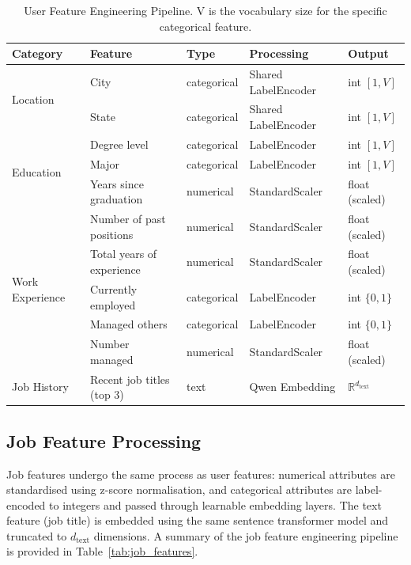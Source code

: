 \begin{table}[H]
    \centering
    \caption{User Feature Engineering Pipeline. V is the vocabulary size for the specific categorical feature. }
    \label{tab:user_features}
    \begin{tabular}{llllp{3.5cm}}
        \toprule
        \textbf{Category} & \textbf{Feature} & \textbf{Type} & \textbf{Processing} & \textbf{Output} \\
        \midrule
        \multirow{2}{*}{Location}
            & City  & categorical & Shared LabelEncoder & int $[1, V]$ \\
            & State & categorical & Shared LabelEncoder & int $[1, V]$ \\
        \midrule
        \multirow{3}{*}{Education}
            & Degree level   & categorical & LabelEncoder & int $[1, V]$ \\
            & Major  & categorical & LabelEncoder & int $[1, V]$ \\
            & Years since graduation & numerical & StandardScaler & float (scaled) \\
        \midrule
        \multirow{5}{*}{Work Experience}
            & Number of past positions & numerical & StandardScaler & float (scaled) \\
            & Total years of experience & numerical & StandardScaler & float (scaled) \\
            & Currently employed & categorical & LabelEncoder & int $\{0,1\}$ \\
            & Managed others & categorical & LabelEncoder & int $\{0,1\}$ \\
            & Number managed & numerical & StandardScaler & float (scaled) \\
        \midrule
        Job History & Recent job titles (top $3$) & text & Qwen Embedding & $\mathbb{R}^{d_{\text{text}}}$ \\
        \bottomrule
    \end{tabular}
\end{table}

\subsection{Job Feature Processing}
\label{sec:job_features_processing}

Job features undergo the same process as user features: numerical attributes are standardised using z-score normalisation, and categorical attributes are label-encoded to integers and passed through learnable embedding layers. The text feature (job title) is embedded using the same sentence transformer model and truncated to $d_{\text{text}}$ dimensions. A summary of the job feature engineering pipeline is provided in Table~\ref{tab:job_features}.

